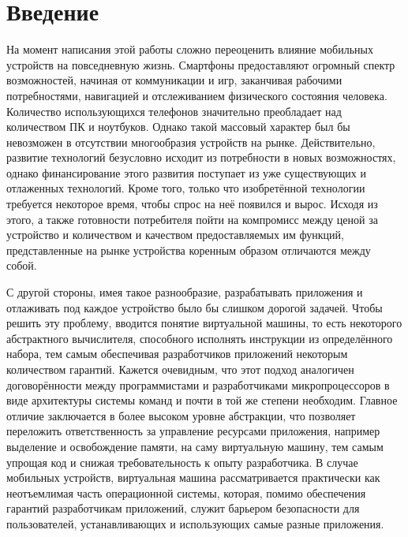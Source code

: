 \chapter{Введение}
\label{sec:Chapter0} 

На момент написания этой работы сложно переоценить влияние мобильных устройств на повседневную жизнь.
Смартфоны предоставляют огромный спектр возможностей, начиная от коммуникации и игр, заканчивая рабочими потребностями, навигацией и отслеживанием физического состояния человека.
Количество использующихся телефонов значительно преобладает над количеством ПК и ноутбуков.
Однако такой массовый характер был бы невозможен в отсутствии многообразия устройств на рынке.
Действительно, развитие технологий безусловно исходит из потребности в новых возможностях, однако финансирование этого развития поступает из уже существующих и отлаженных технологий.
Кроме того, только что изобретённой технологии требуется некоторое время, чтобы спрос на неё появился и вырос.
Исходя из этого, а также готовности потребителя пойти на компромисс между ценой за устройство и количеством и качеством предоставляемых им функций, представленные на рынке устройства коренным образом отличаются между собой.

\par
С другой стороны, имея такое разнообразие, разрабатывать приложения и отлаживать под каждое устройство было бы слишком дорогой задачей.
Чтобы решить эту проблему, вводится понятие виртуальной машины, то есть некоторого абстрактного вычислителя, способного исполнять инструкции из определённого набора, тем самым обеспечивая разработчиков приложений некоторым количеством гарантий.
Кажется очевидным, что этот подход аналогичен договорённости между программистами и разработчиками микропроцессоров в виде архитектуры системы команд и почти в той же степени необходим.
Главное отличие заключается в более высоком уровне абстракции, что позволяет переложить ответственность за управление ресурсами приложения, например выделение и освобождение памяти, на саму виртуальную машину, тем самым упрощая код и снижая требовательность к опыту разработчика.
В случае мобильных устройств, виртуальная машина рассматривается практически как неотъемлимая часть операционной системы, которая, помимо обеспечения гарантий разработчикам приложений, служит барьером безопасности для пользователей, устанавливающих и использующих самые разные приложения. 

